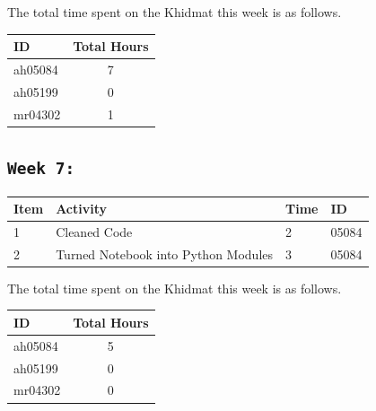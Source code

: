 \documentclass[11pt]{article}
\begin{document}
The total time spent on the Khidmat this week is as follows.    
\begin{center}
\begin{tabular}{|l|c|}
  \hline
  \textbf{ID} & \textbf{Total Hours}\\\hline
  ah05084 & 7 \\\hline
  ah05199 & 0 \\\hline
  mr04302 & 1 \\\hline
\end{tabular}
\end{center}
\newpage
\subsection{\texttt{Week 7: }}
\begin{center}
\begin{tabular}{|l|l|l|l|}
  \hline
  \textbf{Item} 	& \textbf{Activity} & \textbf{Time} & \textbf{ID} \\\hline
  1 & Cleaned Code & 2 & 05084 \\ \hline
  2 & Turned Notebook into Python Modules & 3 & 05084 \\ \hline
\end{tabular}
    
\end{center}
The total time spent on the Khidmat this week is as follows.    
\begin{center}
\begin{tabular}{|l|c|}
  \hline
  \textbf{ID} & \textbf{Total Hours}\\\hline
  ah05084 & 5 \\\hline
  ah05199 & 0 \\\hline
  mr04302 & 0 \\\hline
\end{tabular}
\end{center}
\newpage
\end{document}
